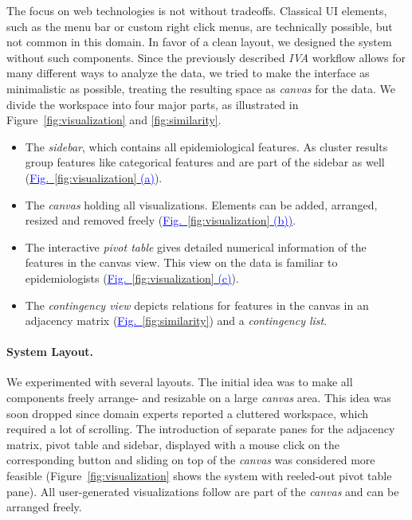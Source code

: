 \documentclass[journal]{style/vgtc} 			          %
\newcommand{\add}[1]{\textcolor{blue}{\uline{#1}}}
\begin{document}
The focus on web technologies is not without tradeoffs.
%
Classical UI elements, such as the menu bar or custom right click menus, are technically possible, but not common in this domain.
%
In favor of a clean layout, we designed the system without such components.
%
Since the previously described \emph{IVA} workflow allows for many different ways to analyze the data, we tried to make the interface as minimalistic as possible, treating the resulting space as \emph{canvas} for the data.
%
We divide the workspace into four major parts, as illustrated in Figure~\ref{fig:visualization} and \ref{fig:similarity}.
\begin{itemize}
		\item The \emph{sidebar}, which contains all epidemiological features. As cluster results group features like categorical features and are part of the sidebar as well (\add{Fig.~\ref{fig:visualization} (a)}).
	\item The \emph{canvas} holding all visualizations. Elements can be added, arranged, resized and removed freely (\add{Fig.~\ref{fig:visualization} (b))}.
	\item The interactive \emph{pivot table} gives detailed numerical information of the features in the canvas view. This view on the data is familiar to epidemiologists (\add{Fig.~\ref{fig:visualization} (c)}).
	\item The \emph{contingency view} depicts relations for features in the canvas in an adjacency matrix (\add{Fig.~\ref{fig:similarity}}) and a \emph{contingency list}.
\end{itemize}

\paragraph{System Layout.}
We experimented with several layouts.
%
The initial idea was to make all components freely arrange- and resizable on a large \emph{canvas} area.
%
This idea was soon dropped since domain experts reported a cluttered workspace, which required a lot of scrolling.
%
The introduction of separate panes for the adjacency matrix, pivot table and sidebar, displayed with a mouse click on the corresponding button and sliding on top of the \emph{canvas} was considered more feasible (Figure~\ref{fig:visualization} shows the system with reeled-out pivot table pane).
%
All user-generated visualizations follow are part of the \emph{canvas} and can be arranged freely.
\end{document}

